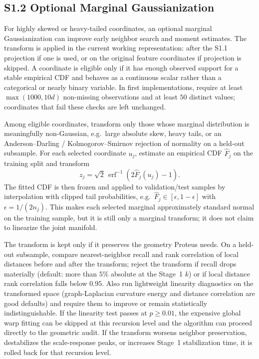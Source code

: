 \documentclass[11pt]{article}
\begin{document}
\subsection*{S1.2 Optional Marginal Gaussianization}
For highly skewed or heavy-tailed coordinates, an optional marginal Gaussianization can improve early neighbor search and moment estimates. The transform is applied in the current working representation: after the S1.1 projection if one is used, or on the original feature coordinates if projection is skipped. A coordinate is eligible only if it has enough observed support for a stable empirical CDF and behaves as a continuous scalar rather than a categorical or nearly binary variable. In first implementations, require at least $\max(1000,10d)$ non-missing observations and at least $50$ distinct values; coordinates that fail these checks are left unchanged.

Among eligible coordinates, transform only those whose marginal distribution is meaningfully non-Gaussian, e.g.\ large absolute skew, heavy tails, or an Anderson--Darling / Kolmogorov--Smirnov rejection of normality on a held-out subsample. For each selected coordinate $u_j$, estimate an empirical CDF $\widehat F_j$ on the training split and transform
\[
z_j=\sqrt{2}\,\operatorname{erf}^{-1}\!\left(2\widehat F_j(u_j)-1\right).
\]
The fitted CDF is then frozen and applied to validation/test samples by interpolation with clipped tail probabilities, e.g.\ $\widehat F_j\in[\epsilon,1-\epsilon]$ with $\epsilon=1/(2n_j)$. This makes each selected marginal approximately standard normal on the training sample, but it is still only a marginal transform; it does not claim to linearize the joint manifold.

The transform is kept only if it preserves the geometry Proteus needs. On a held-out subsample, compare nearest-neighbor recall and rank correlation of local distances before and after the transform; reject the transform if recall drops materially (default: more than $5\%$ absolute at the Stage~1 $k$) or if local distance rank correlation falls below $0.95$. Also run lightweight linearity diagnostics on the transformed space (graph-Laplacian curvature energy and distance correlation are good defaults) and require them to improve or remain statistically indistinguishable. If the linearity test passes at $p\ge 0.01$, the expensive global warp fitting can be skipped at this recursion level and the algorithm can proceed directly to the geometric audit. If the transform worsens neighbor preservation, destabilizes the scale-response peaks, or increases Stage~1 stabilization time, it is rolled back for that recursion level.
\end{document}
